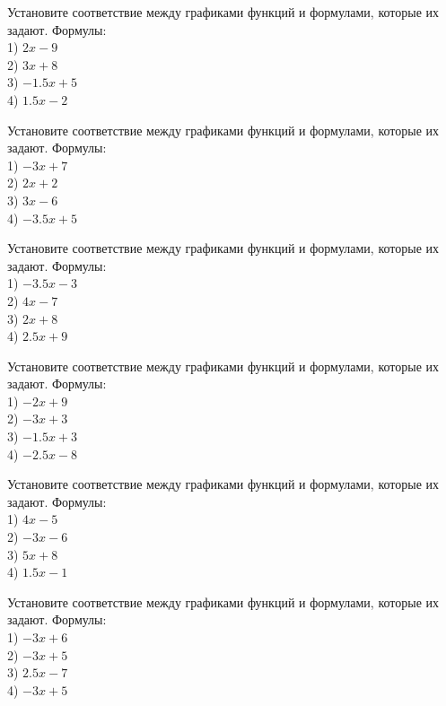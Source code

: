 \documentclass[4apaper]{article}
\begin{document}
\begin{taskBN}{79}
Установите соответствие между графиками функций и формулами, которые их задают. Формулы: \\1) $2x-9$\\2) $3x+8$\\3) $-1.5x+5$\\4) $1.5x-2$
\end{taskBN}

\begin{taskBN}{80}
Установите соответствие между графиками функций и формулами, которые их задают. Формулы: \\1) $-3x+7$\\2) $2x+2$\\3) $3x-6$\\4) $-3.5x+5$
\end{taskBN}

\begin{taskBN}{81}
Установите соответствие между графиками функций и формулами, которые их задают. Формулы: \\1) $-3.5x-3$\\2) $4x-7$\\3) $2x+8$\\4) $2.5x+9$
\end{taskBN}

\begin{taskBN}{82}
Установите соответствие между графиками функций и формулами, которые их задают. Формулы: \\1) $-2x+9$\\2) $-3x+3$\\3) $-1.5x+3$\\4) $-2.5x-8$
\end{taskBN}

\begin{taskBN}{83}
Установите соответствие между графиками функций и формулами, которые их задают. Формулы: \\1) $4x-5$\\2) $-3x-6$\\3) $5x+8$\\4) $1.5x-1$
\end{taskBN}

\begin{taskBN}{84}
Установите соответствие между графиками функций и формулами, которые их задают. Формулы: \\1) $-3x+6$\\2) $-3x+5$\\3) $2.5x-7$\\4) $-3x+5$
\end{taskBN}
\end{document}
